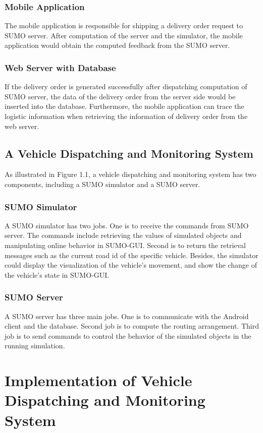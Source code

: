 \documentclass[12pt]{ksthesis}
\begin{document}
\begin{thesis}
{\subsection{Mobile Application}
The mobile application is responsible for shipping a delivery order request to SUMO server. After computation of the server and the simulator, the mobile application would obtain the computed feedback from the SUMO server.

\subsection{Web Server with Database}
If the delivery order is generated successfully after dispatching computation of SUMO server, the data of the delivery order from the server side would be inserted into the database. Furthermore, the mobile application can trace the logistic information when retrieving the information of delivery order from the web server.

\section{A Vehicle Dispatching and Monitoring System}
As illustrated in Figure 1.1, a vehicle dispatching and monitoring system has two components, including a SUMO simulator and a SUMO server.



\subsection{SUMO Simulator}
A SUMO simulator has two jobs. One is to receive the commands from SUMO server. The commands include retrieving the values of simulated objects and manipulating online behavior in SUMO-GUI. Second is to return the retrieval messages such as the current road id of the specific vehicle. Besides, the simulator could display the visualization of the vehicle’s movement, and show the change of the vehicle’s state in SUMO-GUI.

\subsection{SUMO Server}
A SUMO server has three main jobs. One is to communicate with the Android client and the database. Second job is to compute the routing arrangement. Third job is to send commands to control the behavior of the simulated objects in the running simulation.

\chapter{Implementation of Vehicle Dispatching and Monitoring System }\label{Chap:Architecture}

}
\end{thesis}
\end{document}
